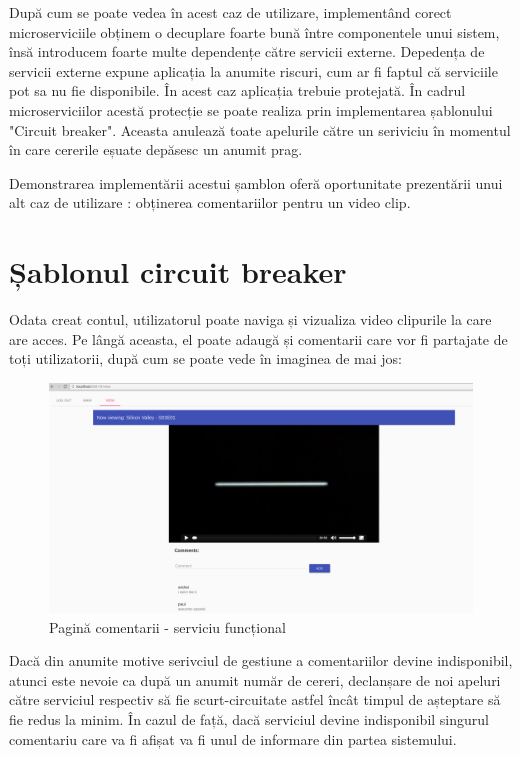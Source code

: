 \documentclass[12pt, a4paper, oneside, romanian]{teza-upb}
\begin{document}
După cum se poate vedea în acest caz de utilizare, implementând corect microserviciile obținem o decuplare foarte bună între componentele unui sistem, însă introducem foarte multe dependențe către servicii externe. Depedența de servicii externe expune aplicația la anumite riscuri, cum ar fi faptul că serviciile pot sa nu fie disponibile. În acest caz aplicația trebuie protejată. În cadrul microserviciilor acestă protecție se poate realiza prin implementarea șablonului "Circuit breaker". Aceasta anulează toate apelurile către un  seriviciu în momentul în care cererile eșuate depăsesc un anumit prag. 

Demonstrarea implementării acestui șamblon oferă oportunitate prezentării unui alt caz de utilizare : obținerea comentariilor pentru un video clip.

\newpage
\section{Șablonul circuit breaker}

Odata creat contul, utilizatorul poate naviga și vizualiza video clipurile la care are acces. Pe lângă aceasta, el poate adaugă și comentarii care vor fi partajate de toți utilizatorii, după cum se poate vede în imaginea de mai jos:
\begin{figure}[ht]
\centering
\includegraphics[scale=0.25]{img/comments-working.png}
\caption{Pagină comentarii - serviciu funcțional}
\label{fig:arhi_componente}
\end{figure}

Dacă din anumite motive serivciul de gestiune a comentariilor devine indisponibil, atunci este nevoie ca după un anumit număr de cereri, declanșare de noi apeluri către serviciul respectiv să fie scurt-circuitate astfel încât timpul de așteptare să fie redus la minim. În cazul de față, dacă serviciul devine indisponibil singurul comentariu care va fi afișat va fi unul de informare din partea sistemului. 
\end{document}
